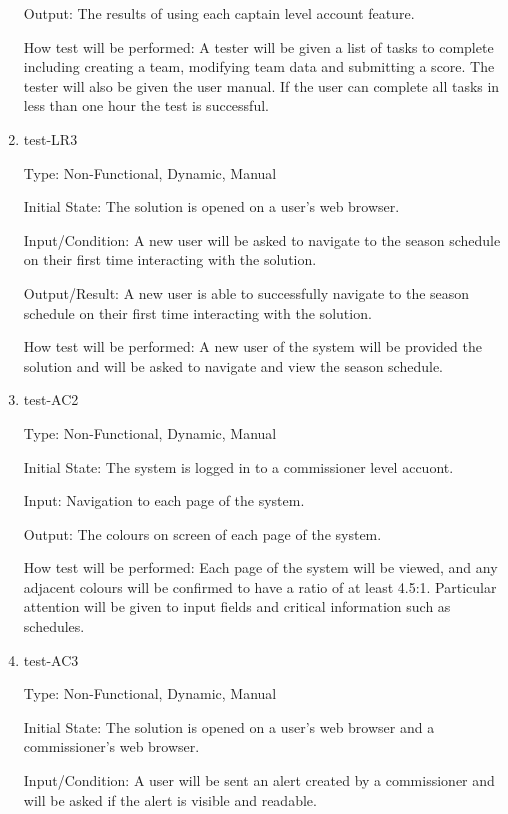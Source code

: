 \documentclass[12pt, titlepage]{article}
\begin{document}
\begin{enumerate}
  Output: The results of using each captain level account feature.

  How test will be performed: A tester will be given a list of tasks to
  complete including creating a team, modifying team data and submitting a
  score. The tester will also be given the user manual. If the user can
  complete all tasks in less than one hour the test is successful.
            
  \item{test-LR3\\}
  
  Type: Non-Functional, Dynamic, Manual
            
  Initial State: The solution is opened on a user's web browser.
            
  Input/Condition: A new user will be asked to navigate to the season schedule on their first
  time interacting with the solution.
            
  Output/Result: A new user is able to successfully navigate to the season schedule on
  their first time interacting with the solution.
            
  How test will be performed: A new user of the system will be provided the solution and
  will be asked to navigate and view the season schedule.

  \item{test-AC2\\}

  Type: Non-Functional, Dynamic, Manual

  Initial State: The system is logged in to a commissioner level accuont.

  Input: Navigation to each page of the system.

  Output: The colours on screen of each page of the system.

  How test will be performed: Each page of the system will be viewed, and any
  adjacent colours will be confirmed to have a ratio of at least 4.5:1.
  Particular attention will be given to input fields and critical information
  such as schedules.

  \item{test-AC3\\}
  
  Type: Non-Functional, Dynamic, Manual
            
  Initial State: The solution is opened on a user's web browser and a commissioner's web
  browser.
            
  Input/Condition: A user will be sent an alert created by a commissioner and will be asked
  if the alert is visible and readable.
            

\end{enumerate}
\end{document}
